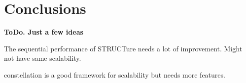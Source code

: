 \chapter{Conclusions}
\label{chap:conclusions}

\textbf{ToDo. Just a few ideas}

The sequential performance of STRUCTure needs
a lot of improvement. Might not have same scalability.

constellation is  a good framework for scalability
but needs more features.

